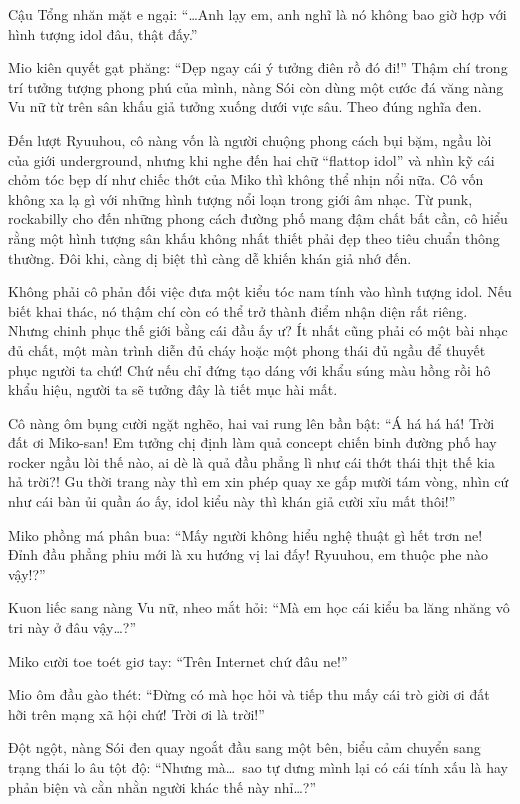 \documentclass[../main.tex]{subfiles}
\begin{document}

Cậu Tổng nhăn mặt e ngại: ``\dots Anh lạy em, anh nghĩ là nó không bao giờ hợp với hình tượng idol đâu, thật đấy.''

Mio kiên quyết gạt phăng: ``Dẹp ngay cái ý tưởng điên rồ đó đi!'' Thậm chí trong trí tưởng tượng phong phú của mình, nàng Sói còn dùng một cước đá văng nàng Vu nữ từ trên sân khấu giả tưởng xuống dưới vực sâu. Theo đúng nghĩa đen.

Đến lượt Ryuuhou, cô nàng vốn là người chuộng phong cách bụi bặm, ngầu lòi của giới underground, nhưng khi nghe đến hai chữ ``flattop idol'' và nhìn kỹ cái chỏm tóc bẹp dí như chiếc thớt của Miko thì không thể nhịn nổi nữa. Cô vốn không xa lạ gì với những hình tượng nổi loạn trong giới âm nhạc. Từ punk, rockabilly cho đến những phong cách đường phố mang đậm chất bất cần, cô hiểu rằng một hình tượng sân khấu không nhất thiết phải đẹp theo tiêu chuẩn thông thường. Đôi khi, càng dị biệt thì càng dễ khiến khán giả nhớ đến.

Không phải cô phản đối việc đưa một kiểu tóc nam tính vào hình tượng idol. Nếu biết khai thác, nó thậm chí còn có thể trở thành điểm nhận diện rất riêng. Nhưng chinh phục thế giới bằng cái đầu ấy ư? Ít nhất cũng phải có một bài nhạc đủ chất, một màn trình diễn đủ cháy hoặc một phong thái đủ ngầu để thuyết phục người ta chứ! Chứ nếu chỉ đứng tạo dáng với khẩu súng màu hồng rồi hô khẩu hiệu, người ta sẽ tưởng đây là tiết mục hài mất.

Cô nàng ôm bụng cười ngặt nghẽo, hai vai rung lên bần bật: ``Á há há há! Trời đất ơi Miko-san! Em tưởng chị định làm quả concept chiến binh đường phố hay rocker ngầu lòi thế nào, ai dè là quả đầu phẳng lì như cái thớt thái thịt thế kia hả trời?! Gu thời trang này thì em xin phép quay xe gấp mười tám vòng, nhìn cứ như cái bàn ủi quần áo ấy, idol kiểu này thì khán giả cười xỉu mất thôi!''

Miko phồng má phân bua: ``Mấy người không hiểu nghệ thuật gì hết trơn ne! Đỉnh đầu phẳng phiu mới là xu hướng vị lai đấy! Ryuuhou, em thuộc phe nào vậy!?''

Kuon liếc sang nàng Vu nữ, nheo mắt hỏi: ``Mà em học cái kiểu ba lăng nhăng vô tri này ở đâu vậy\dots?''

Miko cười toe toét giơ tay: ``Trên Internet chứ đâu ne!''

Mio ôm đầu gào thét: ``Đừng có mà học hỏi và tiếp thu mấy cái trò giời ơi đất hỡi trên mạng xã hội chứ! Trời ơi là trời!''

Đột ngột, nàng Sói đen quay ngoắt đầu sang một bên, biểu cảm chuyển sang trạng thái lo âu tột độ: ``Nhưng mà\dots\ sao tự dưng mình lại có cái tính xấu là hay phản biện và cằn nhằn người khác thế này nhỉ\dots?''
\end{document}
